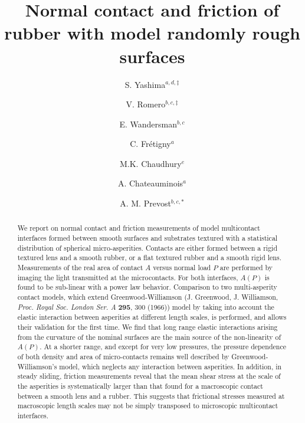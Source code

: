 \documentclass[pre,groupedaddress,showkeys,showpacs,twocolumn]{revtex4}
\begin{document}
\title{Normal contact and friction of rubber with model randomly rough surfaces}
\author{S. Yashima\textit{$^{a,d,\ddag}$}}
\author{V. Romero\textit{$^{b,c,\ddag}$}}
\author{E. Wandersman\textit{$^{b,c}$}}
\author{C. Fr{\'e}tigny\textit{$^{a}$}}
\author{M.K. Chaudhury\textit{$^{e}$}}
\author{A. Chateauminois\textit{$^{a}$}}
\author{A. M. Prevost\textit{$^{b,c,\ast}$}}
%
\begin{abstract}
We report on normal contact and friction measurements of model multicontact interfaces formed between smooth surfaces and substrates textured with a statistical distribution of spherical micro-asperities. Contacts are either formed between a rigid textured lens and a smooth rubber, or a flat textured rubber and a smooth rigid lens. Measurements of the real area of contact $A$ versus normal load $P$ are performed by imaging the light transmitted at the microcontacts. For both interfaces, $A(P)$ is found to be sub-linear with a power law behavior. Comparison to two multi-asperity contact models, which extend Greenwood-Williamson (J. Greenwood, J. Williamson, \textit{Proc. Royal Soc. London Ser. A} \textbf{295}, 300 (1966)) model by taking into account the elastic interaction between asperities at different length scales, is performed, and allows their validation for the first time. We find that long range elastic interactions arising from the curvature of the nominal surfaces are the main 
source of the non-linearity of $A(P)$. At a shorter range, and except for very low pressures, the pressure dependence of both density and area of micro-contacts remains well described by Greenwood-Williamson's model, which neglects any interaction between asperities. In addition, in steady sliding, friction measurements reveal that the mean shear stress at the scale of the asperities is systematically larger than that found for a macroscopic contact between a smooth lens and a rubber. This suggests that frictional stresses measured at macroscopic length scales may not be simply transposed to microscopic multicontact interfaces.
%
\end{abstract}
%
\maketitle
%
\end{document}
